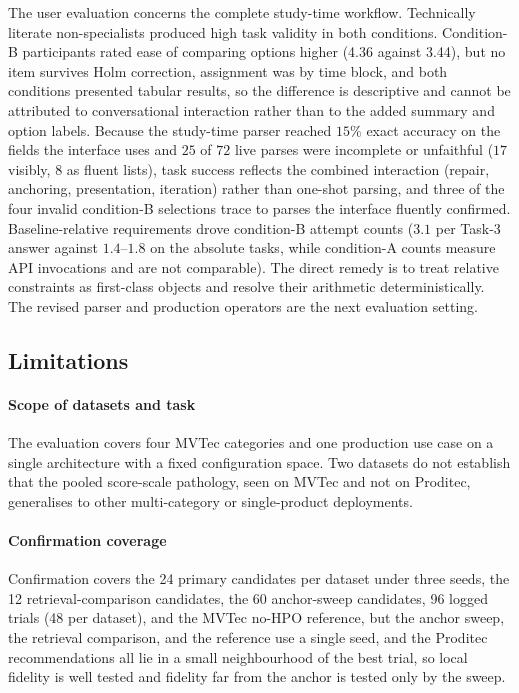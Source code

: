 \documentclass[final,5p,times,twocolumn]{elsarticle}
\begin{document}
The user evaluation concerns the complete study-time workflow.
Technically literate non-specialists produced high task validity in both conditions. Condition-B participants rated ease of comparing
options higher (4.36 against 3.44), but no item survives Holm
correction, assignment was by time block, and both conditions presented
tabular results, so the difference is descriptive and cannot be
attributed to conversational interaction rather than to the added
summary and option labels. Because the study-time parser reached $15\%$
exact accuracy on the fields the interface uses and $25$ of $72$ live parses were incomplete or unfaithful ($17$ visibly, $8$ as fluent lists), task success reflects the combined interaction (repair, anchoring, presentation, iteration) rather than one-shot parsing, and three of the four invalid condition-B selections trace to parses the interface fluently confirmed. Baseline-relative requirements drove condition-B
attempt counts ($3.1$ per Task-3 answer against $1.4$--$1.8$ on the absolute tasks, while condition-A counts measure API invocations and are not
comparable). The direct remedy is to treat relative constraints as
first-class objects and resolve their arithmetic deterministically. The revised parser and production operators are the next evaluation
setting.

\subsection{Limitations}
\label{subsec:limitations}

\paragraph{Scope of datasets and task}
The evaluation covers four MVTec categories and one production use case
on a single architecture with a fixed configuration space. Two datasets do not establish that the pooled score-scale pathology, seen on MVTec
and not on Proditec, generalises to other multi-category or
single-product deployments.

\paragraph{Confirmation coverage}
Confirmation covers the 24 primary candidates per dataset under three
seeds, the 12 retrieval-comparison candidates, the 60 anchor-sweep candidates, 96 logged trials (48 per dataset), and the MVTec no-HPO reference, but the anchor sweep, the retrieval comparison, and the reference use a single seed,
and the Proditec recommendations all lie in a small neighbourhood of the
best trial, so local fidelity is well tested and fidelity far from the
anchor is tested only by the sweep.
\end{document}
